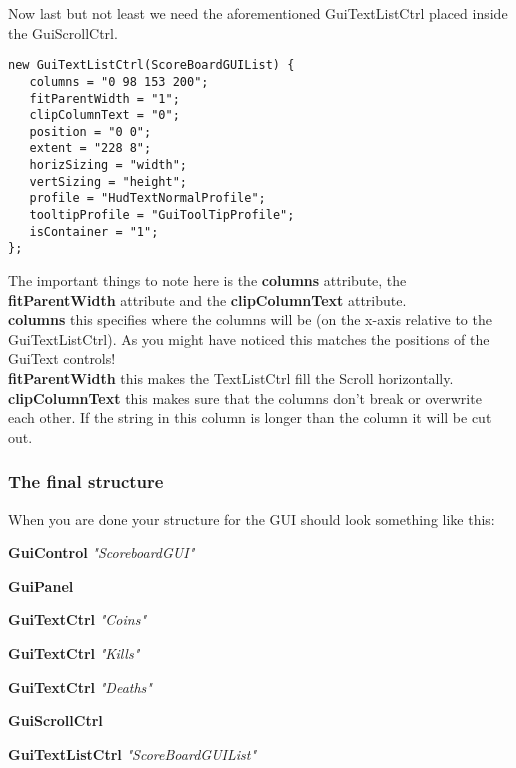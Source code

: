 \begin{frame}[fragile]
Now last but not least we need the aforementioned GuiTextListCtrl placed inside the GuiScrollCtrl.\\
\TS
\begin{lstlisting}
new GuiTextListCtrl(ScoreBoardGUIList) {
   columns = "0 98 153 200";
   fitParentWidth = "1";
   clipColumnText = "0";
   position = "0 0";
   extent = "228 8";
   horizSizing = "width";
   vertSizing = "height";
   profile = "HudTextNormalProfile";
   tooltipProfile = "GuiToolTipProfile";
   isContainer = "1";
};
\end{lstlisting}
The important things to note here is the {\bf columns} attribute, the {\bf fitParentWidth} attribute and
the {\bf clipColumnText} attribute.\\
{\bf columns} this specifies where the columns will be (on the x-axis relative to the GuiTextListCtrl).
As you might have noticed this matches the positions of the GuiText controls!\\
{\bf fitParentWidth} this makes the TextListCtrl fill the Scroll horizontally.\\
{\bf clipColumnText} this makes sure that the columns don't break or overwrite each other. If the string in this column is longer than the column it will be cut out.
\end{frame}

\begin{frame}
\frametitle{The final structure}
When you are done your structure for the GUI should look something like this:
\begin{longenum}
	\item {\bf GuiControl} {\it "ScoreboardGUI"}
	\begin{longenum}
		\item {\bf GuiPanel}
		\begin{longenum}
			\item {\bf GuiTextCtrl} {\it "Coins"}
			\item {\bf GuiTextCtrl} {\it "Kills"}
			\item {\bf GuiTextCtrl} {\it "Deaths"}
			\item {\bf GuiScrollCtrl}
			\begin{longenum}
			\item {\bf GuiTextListCtrl} {\it "ScoreBoardGUIList"}
			\end{longenum}
		\end{longenum}
	\end{longenum}
\end{longenum}
\end{frame}

